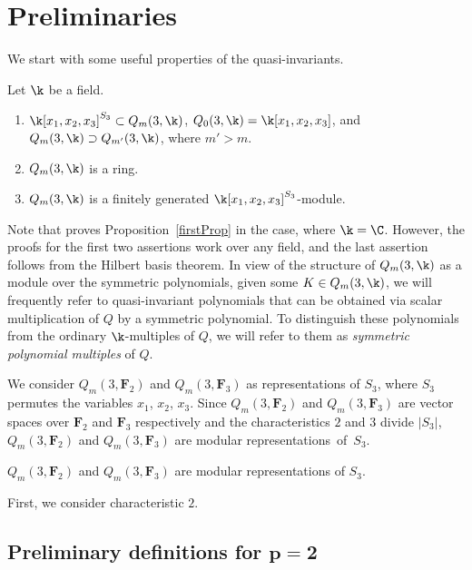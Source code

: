 \section{Preliminaries}\label{prelim}
We start with some useful properties of the quasi-invariants.
\begin{Proposition}\label{firstProp}
 Let $\k$ be a field.
\begin{enumerate}\itemsep=0pt
 \item[$1$.] $\k[x_1,x_2,x_3]^{S_3}\subset Q_m(3,\k)$, $Q_0(3,\k) = \k[x_1,x_2,x_3]$, and $Q_m(3,\k)\supset Q_{m'}(3,\k)$, where ${m'>m}$.
 \item[$2$.] $Q_m(3,\k)$ is a ring.
 \item[$3$.] $Q_m(3,\k)$ is a finitely generated $\k[x_1,x_2,x_3]^{S_3}$-module.
\end{enumerate}
\end{Proposition}

Note that \cite{etingof2002lectures} proves Proposition~\ref{firstProp} in the case, where $\k=\C$. However, the proofs for the first two assertions work over any field, and the last assertion follows from the Hilbert basis theorem. In view of the structure of $Q_m(3,\k)$ as a module over the symmetric polynomials, given some $K\in Q_m(3,\k)$, we will frequently refer to quasi-invariant polynomials that can be obtained via scalar multiplication of $Q$ by a symmetric polynomial. To distinguish these polynomials from the ordinary $\k$-multiples of $Q$, we will refer to them as \emph{symmetric polynomial multiples} of $Q$.

We consider $Q_m(3, \mathbf{F}_{2})$ and $Q_m(3, \mathbf{F}_{3})$ as representations of $S_3$, where $S_3$ permutes the variables $x_1$, $x_2$, $x_3$. Since $Q_m(3, \mathbf{F}_{2})$ and $Q_m(3, \mathbf{F}_{3})$ are vector spaces over $\mathbf{F}_2$ and $\mathbf{F}_3$ respectively and the characteristics $2$ and $3$ divide $|S_3|$, $Q_m(3, \mathbf{F}_{2})$ and $Q_m(3, \mathbf{F}_{3})$ are modular representations~of~$S_3$.

\begin{Proposition}
 $Q_m(3, \mathbf{F}_{2})$ and $Q_m(3, \mathbf{F}_{3})$ are modular representations of $S_3$.
\end{Proposition}

First, we consider characteristic $2$.

\subsection[Preliminary definitions for p=2]{Preliminary definitions for $\boldsymbol{p=2}$}

